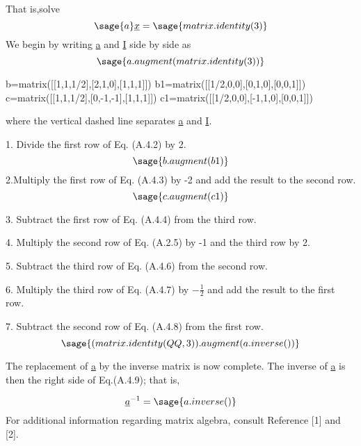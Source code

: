 \documentclass[12pt]{report}
\begin{document}
That is,solve$$ \sage{a}\underline{x} = \sage{matrix.identity(3)}$$
We begin by writing \underline{a} and \underline{I} side by side as
$$\sage{a.augment(matrix.identity(3))}$$
\begin{sagesilent}
b=matrix([[1,1,1/2],[2,1,0],[1,1,1]])
b1=matrix([[1/2,0,0],[0,1,0],[0,0,1]])
c=matrix([[1,1,1/2],[0,-1,-1],[1,1,1]])
c1=matrix([[1/2,0,0],[-1,1,0],[0,0,1]])
\end{sagesilent}

where the vertical dashed line separates \underline{a} and \underline{I}.


1. Divide the first row of Eq. (A.4.2) by 2.
$$\sage{b.augment(b1)}$$
2.Multiply the first row of Eq. (A.4.3) by -2 and add the result to
the second row.
$$\sage{c.augment(c1)}$$

3. Subtract the first row of Eq. (A.4.4) from the third row.


4. Multiply the second row of Eq. (A.2.5) by -1 and the third row by 2.


5. Subtract the third row of Eq. (A.4.6) from the second row.

6. Multiply the third row of Eq. (A.4.7) by $-\frac{1}{2}$ and add the
result to the first row.


7. Subtract the second row of Eq. (A.4.8) from the first row.
$$ \sage{(matrix.identity(QQ,3)).augment(a.inverse())}$$

The replacement of \underline{a} by the inverse matrix is now
complete. The inverse of \underline{a} is then the right side of
Eq.(A.4.9); that is,



$$\underline{a}^{-1} = \sage{a.inverse()}$$
For additional information regarding matrix algebra, consult Reference
[1] and [2].
\end{document}

